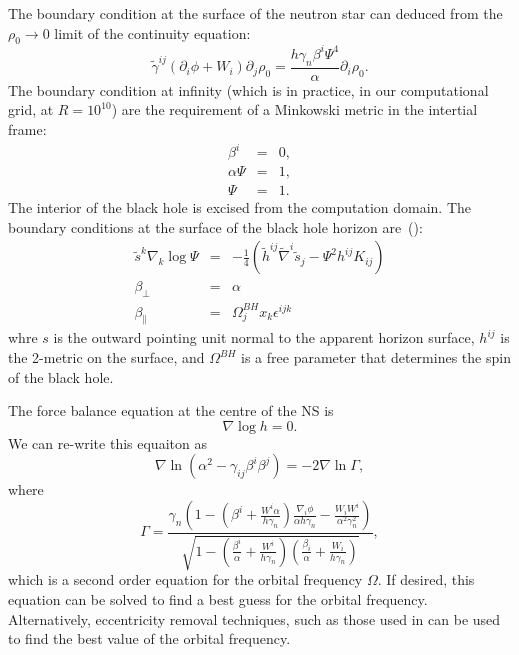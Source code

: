 The boundary condition at the surface of the neutron star can deduced from the $\rho_0\rightarrow 0$ limit of the continuity equation:
\begin{equation}
\tilde{\gamma}^{ij}\left(\partial_i\phi+W_i\right)\partial_j\rho_0=\frac{h\gamma_n\beta^i\Psi^4}{\alpha}\partial_i\rho_0.
\end{equation}
The boundary condition at infinity (which is in practice, in our computational grid, at $R=10^{10}$) are the requirement of a Minkowski metric in the intertial frame:
\begin{eqnarray}
\beta^i&=&0,\\
\alpha\Psi &=& 1,\\
\Psi &=&1.
\end{eqnarray}
The interior of the black hole is excised from the computation domain. The boundary conditions at the surface of the black hole horizon are~(\cite{Cook2004}):
\begin{eqnarray}
\label{eq:BhBoundary}
\tilde{s}^k\nabla_k\log\Psi&=&-\frac{1}{4}\left(\tilde{h}^{ij}\tilde{\nabla}^i\tilde{s}_j-\Psi^2h^{ij}K_{ij}\right) \\
\label{eq:BhBoundary2}
\beta_{\perp}&=&\alpha \\
\label{eq:BhBoundary3}
\beta_{\parallel}&=&\Omega_{j}^{BH}x_k\epsilon^{ijk}
\end{eqnarray}
whre $s$ is the outward pointing unit normal to the apparent horizon
surface, $h^{ij}$ is the 2-metric on the surface, and $\Omega^{BH}$ is a
free parameter that determines the spin of the black hole.

The force balance equation at the centre of the NS is 
\begin{equation}
\nabla\log h=0.
\end{equation}
We can re-write this equaiton as 
 \begin{equation}
\label{eq:OmegaDriver}
\nabla\ln\left(\alpha^2-\gamma_{ij}\beta^{i}\beta^{j}\right)=-2\nabla\ln\Gamma,
\end{equation}
where
\begin{equation}
\Gamma
=\frac{\gamma_n\left(1-\left(\beta^i+\frac{W^i\alpha}{h\gamma_n}\right)\frac{\nabla_i\phi}{\alpha
    h\gamma_n}- \frac{W_i W^i}{\alpha^2\gamma_n^2}\right) } { \sqrt{ 1
    - \left(\frac{\beta^i}{\alpha}+\frac{W^i}{h\gamma_n}\right)
    \left(\frac{\beta_i}{\alpha}+\frac{W_i}{h\gamma_n}\right) } } ,
\end{equation}
which is a second order equation for the orbital
frequency $\Omega$. If desired, this equation can be solved to find a
best guess for the orbital frequency. Alternatively, eccentricity
removal techniques, such as those used in \cite{Tacik:2015tja} can be
used to find the best value of the orbital frequency.

